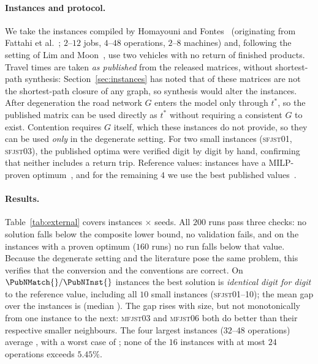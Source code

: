 \paragraph{Instances and protocol.}
We take the \PubNInst{} instances compiled by Homayouni and Fontes~\cite{homayouni2021production} (originating from Fattahi et al.~\cite{fattahi2007mathematical}; $2$--$12$ jobs, $4$--$48$ operations, $2$--$8$ machines) and, following the setting of Lim and Moon~\cite{lim2023twophase}, use two vehicles with no return of finished products. Travel times are taken \emph{as published} from the released matrices, without shortest-path synthesis: Section~\ref{sec:instances} has noted that \PubNLayoutBad{} of these matrices are not the shortest-path closure of any graph, so synthesis would alter the instances.
After degeneration the road network $G$ enters the model only through $t^{*}$, so the published matrix can be used directly as $t^{*}$ without requiring a consistent $G$ to exist. Contention requires $G$ itself, which these instances do not provide, so they can be used \emph{only} in the degenerate setting.
For two small instances (\textsc{sfjst}01, \textsc{sfjst}03), the published optima were verified digit by digit by hand, confirming that neither includes a return trip.
Reference values: \PubNOpt{} instances have a MILP-proven optimum~\cite{homayouni2021production}, and for the remaining $4$ we use the best published values~\cite{lim2023twophase}.

\paragraph{Results.}
Table~\ref{tab:external} covers \PubNInst{} instances $\times$ \NSeeds{} seeds. All $200$ runs pass three checks: no solution falls below the composite lower bound, no validation fails, and on the \PubNOpt{} instances with a proven optimum ($160$ runs) no run falls below that value. Because the degenerate setting and the literature pose the same problem, this verifies that the conversion and the conventions are correct.
On $\PubNMatch{}/\PubNInst{}$ instances the best solution is \emph{identical digit for digit} to the reference value, including all $10$ small instances (\textsc{sfjst}01--10); the mean gap over the \PubNInst{} instances is \PubGapMean{} (median \PubGapMed{}).
The gap rises with size, but not monotonically from one instance to the next: \textsc{mfjst}03 and \textsc{mfjst}06 both do better than their respective smaller neighbours. The four largest instances ($32$--$48$ operations) average \PubGapBig{}, with a worst case of \PubGapMax{}; none of the $16$ instances with at most $24$ operations exceeds $5.45\%$.

